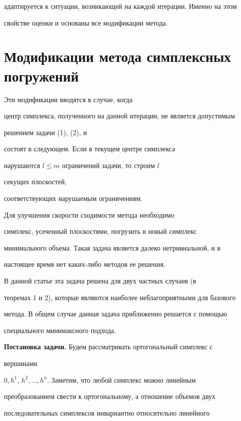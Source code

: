 адаптируется к ситуации, возникающей на каждой итерации. Именно на этом


свойстве оценки и основаны все модификации метода.





\section{Модификации метода симплексных погружений}





Эти модификации вводятся в случае, когда


центр симплекса, полученного на данной итерации, не является допустимым


решением задачи (1), (2), и


состоят в следующем. Если в текущем центре симплекса


нарушаются $l\le m$ ограничений задачи, то строим $l$


секущих плоскостей,


соответствующих нарушаемым ограничениям.


Для улучшения скорости сходимости метода необходимо


симплекс, усеченный плоскостями, погрузить в новый симплекс


минимального объема. Такая задача является далеко нетривиальной, и в


настоящее время нет каких-либо методов ее решения.





В данной статье эта задача решена для двух частных случаев (в


теоремах 1 и 2), которые являются наиболее неблагоприятными для базового


метода. В общем случае данная задача приближенно решается с помощью


специального минимаксного подхода.





{\bf Постановка задачи.} Будем рассматривать ортогональный симплекс с


вершинами


$0,h^1$, $h^2,\dotsc,h^n$. Заметим, что любой симплекс можно линейным


преобразованием свести к ортогональному, а отношение объемов двух


последовательных симплексов инвариантно относительно линейного


